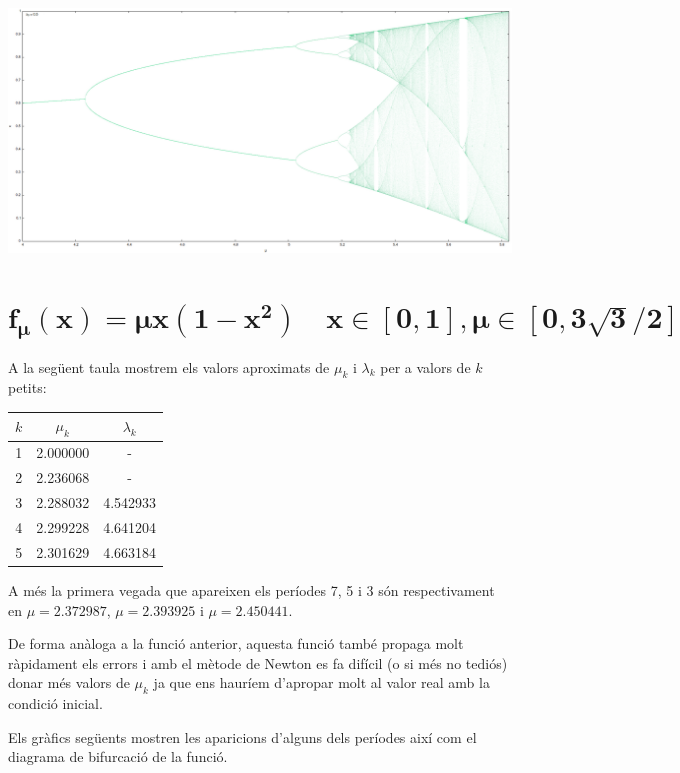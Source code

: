 \documentclass[a4paper]{article}
\theoremstyle{definition}
\begin{document}
\begin{center}
  \begin{minipage}{\linewidth}
    \centering
    \includegraphics[width=0.8\linewidth]{Images/map2.png}
  \end{minipage}
\end{center}

\newpage
\section{\texorpdfstring{$\boldsymbol{f_\mu(x)=\mu x(1-x^2)\quad x\in[0,1], \mu\in[0,3\sqrt{3}/2]}$}{f3}}
A la següent taula mostrem els valors aproximats de $\mu_k$ i $\lambda_k$ per a valors de $k$ petits:
\begin{table}[ht]
  \centering
  \begin{tabular}{c|c|c}
    $k$ & $\mu_k$  & $\lambda_k$ \\
    \hline
    \hline
    1   & 2.000000 & -           \\
    2   & 2.236068 & -           \\
    3   & 2.288032 & 4.542933    \\
    4   & 2.299228 & 4.641204    \\
    5   & 2.301629 & 4.663184
  \end{tabular}
\end{table}
A més la primera vegada que apareixen els períodes 7, 5 i 3 són respectivament en $\mu = 2.372987$, $\mu= 2.393925$ i $\mu =2.450441$.

De forma anàloga a la funció anterior, aquesta funció també propaga molt ràpidament els errors i amb el mètode de Newton es fa difícil (o si més no tediós) donar més valors de $\mu_k$ ja que ens hauríem d'apropar molt al valor real amb la condició inicial.

Els gràfics següents mostren les aparicions d'alguns dels períodes així com el diagrama de bifurcació de la funció.
\end{document}

